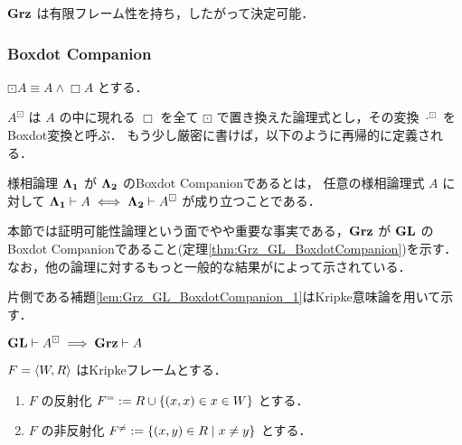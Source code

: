 \documentclass{jsarticle}
\begin{document}
\begin{corollary}
	$\mathbf{Grz}$ は有限フレーム性を持ち，したがって決定可能．
\end{corollary}

\subsubsection{Boxdot Companion}

\begin{definition}
	$\boxdot A \equiv A \land \Box A$ とする．
\end{definition}

\begin{definition}[Boxdot変換]
	$A^\boxdot$ は $A$ の中に現れる $\Box$ を全て $\boxdot$ で置き換えた論理式とし，その変換 $\cdot^\boxdot$ をBoxdot変換と呼ぶ．
	もう少し厳密に書けば，以下のように再帰的に定義される．
\end{definition}

\begin{definition}
	様相論理 $\mathbf{\Lambda_1}$ が $\mathbf{\Lambda_2}$ のBoxdot Companionであるとは，
	任意の様相論理式 $A$ に対して $\mathbf{\Lambda_1} \vdash A \iff \mathbf{\Lambda_2} \vdash A^\boxdot$ が成り立つことである．
\end{definition}

本節では証明可能性論理という面でやや重要な事実である，$\mathbf{Grz}$ が $\mathbf{GL}$ のBoxdot Companionであること(定理\ref{thm:Grz_GL_BoxdotCompanion})を示す．
なお，他の論理に対するもっと一般的な結果が\cite*{jerabek_cluster_2016}によって示されている．

片側である補題\ref{lem:Grz_GL_BoxdotCompanion_1}はKripke意味論を用いて示す．

\begin{lemma}\label{lem:Grz_GL_BoxdotCompanion_1}
	$\mathbf{GL} \vdash A^\boxdot \implies \mathbf{Grz} \vdash A$
\end{lemma}

\begin{definition}
	$F = \langle W, R \rangle$ はKripkeフレームとする．
	\begin{enumerate}
		\item $F$ の反射化 $F^{=} := R \cup \{ (x, x) \in x \in W\}$ とする．
		\item $F$ の非反射化 $F^{\neq} := \{(x,y) \in R \mid x \neq y \}$ とする．
	\end{enumerate}
\end{definition}
\end{document}
